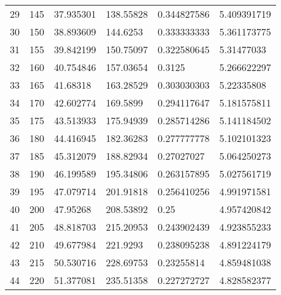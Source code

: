 \documentclass[../Matt_Gebert_Honours_Thesis.tex]{subfiles}
\begin{document}
\begin{longtable}[c]{l|lllll}
	29  & 145                     & 37.935301               & 138.55828 & 0.344827586             & 5.409391719            \\
	30  & 150                     & 38.893609               & 144.6253  & 0.333333333             & 5.361173775            \\
	31  & 155                     & 39.842199               & 150.75097 & 0.322580645             & 5.31477033             \\
	32  & 160                     & 40.754846               & 157.03654 & 0.3125                  & 5.266622297            \\
	33  & 165                     & 41.68318                & 163.28529 & 0.303030303             & 5.22335808             \\
	34  & 170                     & 42.602774               & 169.5899  & 0.294117647             & 5.181575811            \\
	35  & 175                     & 43.513933               & 175.94939 & 0.285714286             & 5.141184502            \\
	36  & 180                     & 44.416945               & 182.36283 & 0.277777778             & 5.102101323            \\
	37  & 185                     & 45.312079               & 188.82934 & 0.27027027              & 5.064250273            \\
	38  & 190                     & 46.199589               & 195.34806 & 0.263157895             & 5.027561719            \\
	39  & 195                     & 47.079714               & 201.91818 & 0.256410256             & 4.991971581            \\
	40  & 200                     & 47.95268                & 208.53892 & 0.25                    & 4.957420842            \\
	41  & 205                     & 48.818703               & 215.20953 & 0.243902439             & 4.923855233            \\
	42  & 210                     & 49.677984               & 221.9293  & 0.238095238             & 4.891224179            \\
	43  & 215                     & 50.530716               & 228.69753 & 0.23255814              & 4.859481038            \\
	44  & 220                     & 51.377081               & 235.51358 & 0.227272727             & 4.828582377            \\

\end{longtable}
\end{document}
